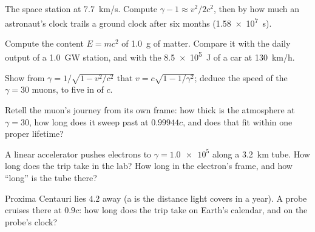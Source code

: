 \begin{exercise}[$\star\star$]\label{exo:g12:special-relativity:10}
The space station  at \qty{7.7}{km/s}. Compute
$\gamma - 1 \approx v^2/2c^2$, then by how much an astronaut's clock trails
a ground clock after six months (\qty{1.58e7}{s}).
\end{exercise}

\begin{exercise}[$\star\star$]\label{exo:g12:special-relativity:11}
Compute the  content $E = mc^2$ of \qty{1.0}{g} of matter. Compare it
with the daily output of a \qty{1.0}{GW}  station, and with the
\qty{8.5e5}{J}  of a car at \qty{130}{km/h}.
\end{exercise}

\begin{exercise}[$\star\star\star$]\label{exo:g12:special-relativity:12}
Show from $\gamma = 1/\sqrt{1 - v^2/c^2}$ that $v = c\sqrt{1 - 1/\gamma^2}$;
deduce the speed of the $\gamma = 30$ muons, to five  in
 of $c$.
\end{exercise}

\begin{exercise}[$\star\star\star$]\label{exo:g12:special-relativity:13}
Retell the muon's journey from its own frame: how thick is the atmosphere
at $\gamma = 30$, how long does it sweep past at $0.99944c$, and does that
fit within one proper lifetime?
\end{exercise}

\begin{exercise}[$\star\star\star$]\label{exo:g12:special-relativity:14}
A linear accelerator pushes electrons to $\gamma = \num{1.0e5}$ along a
\qty{3.2}{km} tube. How long does the trip take in the lab? How long in the
electron's frame, and how ``long'' is the tube there?
\end{exercise}

\begin{exercise}[$\star\star\star$]\label{exo:g12:special-relativity:15}
Proxima Centauri lies $4.2$  away (a  is the distance
light covers in a year). A probe cruises there at $0.9c$: how long does the
trip take on Earth's calendar, and on the probe's clock?
\end{exercise}

